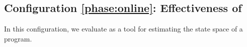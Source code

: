 


\subsection{Configuration \ref{phase:online}: Effectiveness of \testor}

In this configuration, we evaluate \testor as a tool for estimating the state space of a program.

